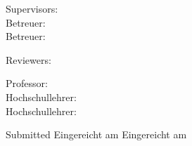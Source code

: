 \begin{titlepage}
\begin{center}
	\vspace{.5cm}
\end{center}

	\noindent
	\ifx\doclanguage\english
		Supervisors: \\
	\fi
	\ifx\doclanguage\german
		Betreuer: \\
	\fi
	\ifx\doclanguage\ngerman
		Betreuer: \\
	\fi
	\supervisors
	
	\vspace{.5cm}
	
	\noindent
	\ifx\doclanguage\english
		Reviewers: \\
	\fi
	\reviewers
	
	\vspace{.5cm}
	
	\noindent
	\ifx\doclanguage\english
		Professor: \\
	\fi
	\ifx\doclanguage\german
		Hochschullehrer: \\
	\fi
	\ifx\doclanguage\ngerman
		Hochschullehrer: \\
	\fi
	\professor
	
	\vspace{1.5cm}
	
	\noindent
	\ifx\doclanguage\english
		Submitted
	\fi
	\ifx\doclanguage\german
		Eingereicht am
	\fi
	\ifx\doclanguage\ngerman
		Eingereicht am
	\fi
	\docdate



\end{titlepage}

\restoregeometry
